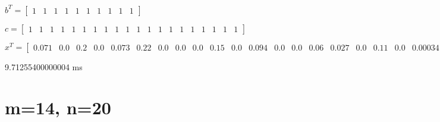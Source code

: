 \documentclass[8pt]{article}
\begin{document}
$ b^T =
\begin{bmatrix}
  1  &  1  &  1  &  1  &  1  &  1  &  1  &  1  &  1  &  1 
\end{bmatrix}
$


$ c =
\begin{bmatrix}
  1  &  1  &  1  &  1  &  1  &  1  &  1  &  1  &  1  &  1  &  1  &  1  &  1  &  1  &  1  &  1  &  1  &  1  &  1  &  1 
\end{bmatrix}
$


$ x^T =
\begin{bmatrix}
  0.071 &  0.0 &  0.2 &  0.0 &  0.073 &  0.22 &  0.0 &  0.0 &  0.0 &  0.15 &  0.0 &  0.094 &  0.0 &  0.0 &  0.06 &  0.027 &  0.0 &  0.11 &  0.0 &  0.00034
\end{bmatrix}
$


9.71255400000004  ms


\section{ m=14, n=20 }
\end{document}

